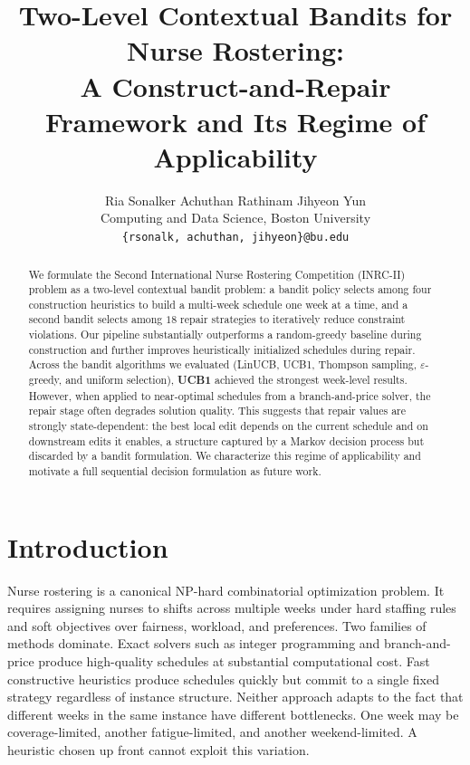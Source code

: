 \documentclass{article}
\title{
Two-Level Contextual Bandits for Nurse Rostering:\\
A Construct-and-Repair Framework and Its Regime of Applicability
}
\author{
Ria Sonalker \quad Achuthan Rathinam \quad Jihyeon Yun \\
Computing and Data Science, Boston University \\
\texttt{\{rsonalk, achuthan, jihyeon\}@bu.edu}
}
\begin{document}
\maketitle

\begin{abstract}
We formulate the Second International Nurse Rostering Competition
(INRC-II) problem as a two-level contextual bandit problem: a bandit
policy selects among four construction heuristics to build a multi-week
schedule one week at a time, and a second bandit selects among $18$ repair
strategies to iteratively reduce constraint violations. Our pipeline
substantially outperforms a random-greedy baseline during construction
and further improves heuristically initialized schedules during repair.
Across the bandit algorithms we evaluated (LinUCB, UCB1, Thompson sampling,
$\varepsilon$-greedy, and uniform selection), \textbf{UCB1}
achieved the strongest week-level results. However, when applied to
near-optimal schedules from a branch-and-price solver, the repair stage
often degrades solution quality. This suggests that repair values are
strongly state-dependent: the best local edit depends on the current
schedule and on downstream edits it enables, a structure captured by a
Markov decision process but discarded by a bandit formulation. We
characterize this regime of applicability and motivate a full sequential
decision formulation as future work.
\end{abstract}

\section{Introduction}

Nurse rostering is a canonical NP-hard combinatorial optimization problem.
It requires assigning nurses to shifts across multiple weeks under hard
staffing rules and soft objectives over fairness, workload, and
preferences. Two families of methods dominate. Exact solvers such as
integer programming and branch-and-price produce high-quality schedules
at substantial computational cost. Fast constructive heuristics produce
schedules quickly but commit to a single fixed strategy regardless of
instance structure. Neither approach adapts to the fact that different
weeks in the same instance have different bottlenecks. One week may be
coverage-limited, another fatigue-limited, and another weekend-limited. A
heuristic chosen up front cannot exploit this variation.
\end{document}
